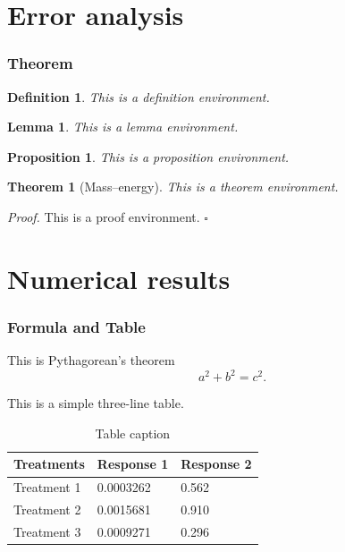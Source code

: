 \documentclass[notheorems,11pt,compress]{beamer}
\newtheorem{theorem}{Theorem}
\numberwithin{theorem}{section}
\newtheorem{lemma}{Lemma}
\numberwithin{lemma}{section}
\numberwithin{corollary}{section}
\newtheorem{definition}{Definition}
\numberwithin{definition}{section}
\newtheorem{proposition}{Proposition}
\numberwithin{proposition}{section}
\theoremstyle{example}
\renewenvironment{proof}[1][Proof]{\par\textit{#1.}%
\enspace\ignorespaces}{\par}
\newcommand{\QED}{\hfill\ensuremath{\square}}
\numberwithin{figure}{section}
\numberwithin{table}{section}
\numberwithin{equation}{section}
\begin{document}
\section{Error analysis}

\begin{frame}
\frametitle{Theorem}

\begin{definition}
This is a definition environment.
\end{definition}

\begin{lemma}
This is a lemma environment.
\end{lemma}

\begin{proposition}
This is a proposition environment.
\end{proposition}

\begin{theorem}[Mass--energy]
This is a theorem environment.
\end{theorem}

\begin{proof}
  This is a proof environment. \QED
\end{proof}

\end{frame}


\section{Numerical results}  %


\begin{frame}
\frametitle{Formula and Table}

This is Pythagorean's theorem
\begin{equation}\label{Pythagorean}
  a^2+b^2=c^2.
\end{equation}

This is a simple three-line table.
\begin{table}
\caption{Table caption}
\begin{tabular}{l l l}
\toprule
Treatments & Response 1 & Response 2 \\
\midrule
Treatment 1 & 0.0003262 & 0.562 \\
Treatment 2 & 0.0015681 & 0.910 \\
Treatment 3 & 0.0009271 & 0.296 \\
\bottomrule
\end{tabular}
\end{table}

\end{frame}
\end{document}

